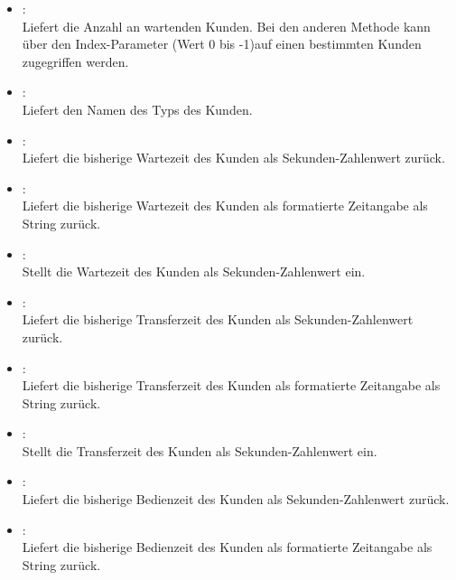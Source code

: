 \begin{itemize}

\item
{}:\\
Liefert die Anzahl an wartenden Kunden. Bei den anderen Methode kann
über den Index-Parameter (Wert 0 bis -1)auf einen bestimmten
Kunden zugegriffen werden.

\item
{}:\\
Liefert den Namen des Typs des Kunden.

\item
{}:\\
Liefert die bisherige Wartezeit des Kunden als Sekunden-Zahlenwert zurück.

\item
{}:\\
Liefert die bisherige Wartezeit des Kunden als formatierte Zeitangabe als String zurück.

\item
{}:\\
Stellt die Wartezeit des Kunden als Sekunden-Zahlenwert ein.

\item
{}:\\
Liefert die bisherige Transferzeit des Kunden als Sekunden-Zahlenwert zurück.

\item
{}:\\
Liefert die bisherige Transferzeit des Kunden als formatierte Zeitangabe als String zurück.

\item
{}:\\
Stellt die Transferzeit des Kunden als Sekunden-Zahlenwert ein.

\item
{}:\\
Liefert die bisherige Bedienzeit des Kunden als Sekunden-Zahlenwert zurück.

\item
{}:\\
Liefert die bisherige Bedienzeit des Kunden als formatierte Zeitangabe als String zurück.


\end{itemize}
